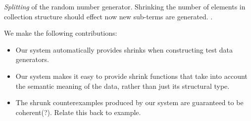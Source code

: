 \emph{Splitting} of the random number generator. Shrinking the number of elements in collection structure should effect now new sub-terms are generated. .

We make the following contributions:
\begin{itemize}
\item Our system automatically provides shrinks when constructing test data generators.

\item Our system makes it easy to provide shrink functions that take into account the semantic meaning of the data, rather than just its structural type.

\item The shrunk counterexamples produced by our system are guaranteed to be coherent(?). Relate this back to example.
\end{itemize}
